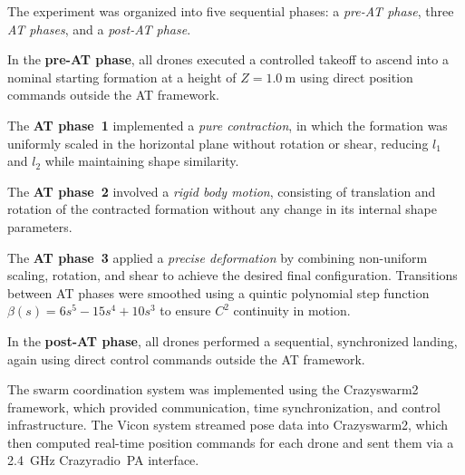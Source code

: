 \documentclass[journal]{IEEEtran}
\theoremstyle{definition}
\theoremstyle{plain}
\begin{document}
The experiment was organized into five sequential phases: a \textit{pre-AT phase}, three \textit{AT phases}, and a \textit{post-AT phase}.  

In the \textbf{pre-AT phase}, all drones executed a controlled takeoff to ascend into a nominal starting formation at a height of $Z = 1.0\ \mathrm{m}$ using direct position commands outside the AT framework.  

The \textbf{AT phase~1} implemented a \textit{pure contraction}, in which the formation was uniformly scaled in the horizontal plane without rotation or shear, reducing $l_1$ and $l_2$ while maintaining shape similarity.  

The \textbf{AT phase~2} involved a \textit{rigid body motion}, consisting of translation and rotation of the contracted formation without any change in its internal shape parameters.  

The \textbf{AT phase~3} applied a \textit{precise deformation} by combining non-uniform scaling, rotation, and shear to achieve the desired final configuration. Transitions between AT phases were smoothed using a quintic polynomial step function $\beta(s) = 6s^5 - 15s^4 + 10s^3$ to ensure $C^2$ continuity in motion.  

In the \textbf{post-AT phase}, all drones performed a sequential, synchronized landing, again using direct control commands outside the AT framework.

\begin{table}[!t]
\centering
\scriptsize
\setlength{\tabcolsep}{4.5pt}   %
\renewcommand{\arraystretch}{1.1}
\caption{Parameters for mixed virtual-hardware experiment}
\label{tab:experiment_params}
\end{table}


The swarm coordination system was implemented using the Crazyswarm2 framework, which provided communication, time synchronization, and control infrastructure. The Vicon system streamed pose data into Crazyswarm2, which then computed real-time position commands for each drone and sent them via a 2.4~GHz Crazyradio~PA interface.
\end{document}
